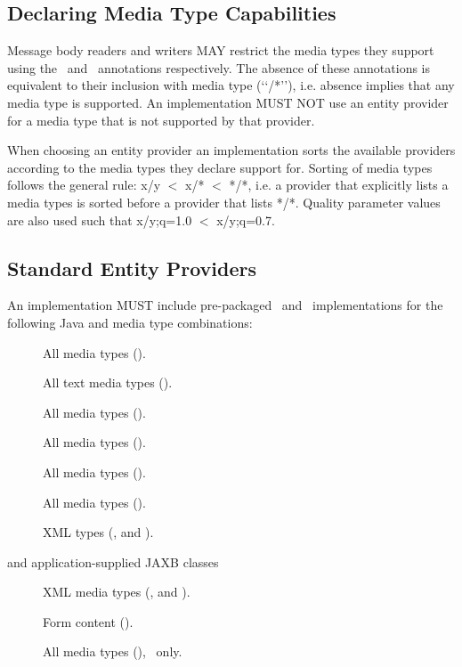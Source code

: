 \subsection{Declaring Media Type Capabilities}
\label{declaring_provider_capabilities}

Message body readers and writers MAY restrict the media types they support using the \ConsumeMime\ and \ProduceMime\ annotations respectively. The absence of these annotations is equivalent to their inclusion with media type (\lq\lq*/*\rq\rq), i.e. absence implies that any media type is supported. An implementation MUST NOT use an entity provider for a media type that is not supported by that provider.

When choosing an entity provider an implementation sorts the available providers according to the media types they declare support for. Sorting of media types follows the general rule: x/y $<$ x/* $<$ */*, i.e. a provider that explicitly lists a media types is sorted before a provider that lists */*. Quality parameter values are also used such that x/y;q=1.0 $<$ x/y;q=0.7.

\subsection{Standard Entity Providers}
\label{standard_entity_providers}

An implementation MUST include pre-packaged \MsgRead\ and \MsgWrite\ implementations for the following Java and media type combinations:

\begin{description}
\item[] All media types (\code{*/*}).
\item[] All text media types ().
\item[] All media types (\code{*/*}).
\item[] All media types (\code{*/*}).
\item[] All media types (\code{*/*}).
\item[] All media types (\code{*/*}).
\item[] XML types (,  and ).
\item[ and application-supplied JAXB classes] XML media types (,  and ).
\item[] Form content ().
\item[] All media types (\code{*/*}), \MsgWrite\ only.
\end{description}

